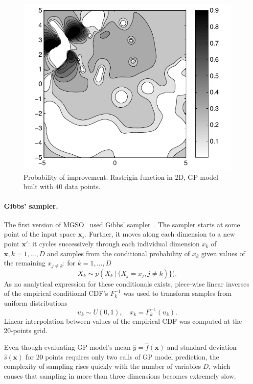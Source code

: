 \documentclass{itatnew}
\newcommand{\xx}{\mathrm{\mathbf{x}}}
\begin{document}
\begin{figure}
  \centering
  \includegraphics[width=0.75\linewidth]{poi_example_filled}
  {\small
  \caption{Probability of improvement. Rastrigin function in 2D, GP model built with 40 data points.
  \label{fig:poi}
  }
  }
\end{figure}

\paragraph{Gibbs' sampler.}

The first version of MGSO~\cite{bajer_model_2013} used Gibbs' sampler~\cite{geman_stochastic_1984}. The sampler starts at some point of the input space $\xx_s$. Further, it moves along each dimension to a new point $\xx'$: it cycles successively through each individual dimension $x_k$ of $\xx, k = 1,\ldots,D$ and samples from the conditional probability of $x_k$ given values of the remaining $x_{j \neq k}$: for $k=1,\ldots,D$
\begin{equation}
X_k \sim p(X_k \, | \, \{X_j = x_j, j \neq k)\}).
\end{equation}
As no analytical expression for these conditionals exists, piece-wise linear inverses of the empirical conditional CDF's $F^{-1}_k$ was used to transform samples from uniform distributions
\begin{displaymath}
u_k \sim U(0,1), \quad  x_k = F^{-1}_k(u_k).
\end{displaymath}
Linear interpolation between values of the empirical CDF was computed at the 20-points grid.

Even though evaluating GP model's mean $\hat{y} = \hat{f}(\xx)$ and standard deviation $\hat{s}(\xx)$ for 20 points requires only two calls of GP model prediction, the complexity of sampling rises quickly with the number of variables $D$, which causes that sampling in more than three dimensions becomes extremely slow.
\end{document}
